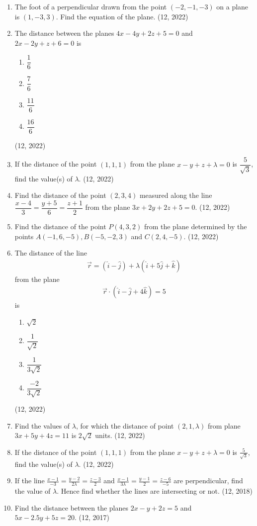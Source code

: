 \begin{enumerate}[label=\thesubsection.\arabic*, ref=\thesubsection.\theenumi]
\item The foot of a perpendicular drawn from the point $(-2,-1,-3)$ on a plane is $(1,-3,3)$. Find the equation of the plane. \hfill (12, 2022)
\item The distance between the planes $4x-4y+2z+5=0$ and $2x-2y+z+6=0$ is
	\begin{enumerate}
		\item $\dfrac{1}{6}$
		\item $\dfrac{7}{6}$
		\item $\dfrac{11}{6}$
		\item $\dfrac{16}{6}$
	\end{enumerate}
\hfill (12, 2022)
\item If the distance of the point $(1,1,1)$ from the plane $x-y+z+\lambda=0$ is $\dfrac{5}{\sqrt{3}}$, find the value(s) of $\lambda$. \hfill (12, 2022)

\item Find the distance of the point $(2,3,4)$ measured along the line $\dfrac{x-4}{3}=\dfrac{y+5}{6}=\dfrac{z+1}{2}$ from the plane $3x+2y+2z+5=0$. \hfill (12, 2022)

\item Find the distance of the point $P(4,3,2)$ from the plane determined by the points $A(-1,6,-5),B(-5,-2,3)$ and $C(2,4,-5)$. \hfill (12, 2022)

\item The distance of the line
	\begin{align}
		\vec{r}=(\hat{i}-\hat{j})+\lambda(\hat{i}+5\hat{j}+\hat{k})
	\end{align}
	from the plane
	\begin{align}
		\vec{r}\cdot(\hat{i}-\hat{j}+4\hat{k})=5
	\end{align}
	is
	\begin{enumerate}
		\item $\sqrt{2}$
		\item $\dfrac{1}{\sqrt{2}}$
		\item $\dfrac{1}{3\sqrt{2}}$
		\item $\dfrac{-2}{3\sqrt{2}}$
	\end{enumerate}
\hfill (12, 2022)

\item Find the values of $\lambda$, for which the distance of point $(2,1,\lambda)$ from plane $3x+5y+4z=11$ is $2\sqrt{2}$ units. \hfill (12, 2022)
\item If the distance of the point $(1,1,1)$ from the plane $x-y+z+\lambda=0$ is $\frac{5}{\sqrt{3}}$, find the value(s) of $\lambda$. \hfill (12, 2022)
\item If the line $\frac{x-1}{-3} = \frac{y-2}{2\lambda} = \frac{z-3}{2} $ and $\frac{x-1}{3\lambda} = \frac{y-1}{2}  = \frac{z-6}{-5} $ are perpendicular, find the value of $\lambda$. Hence find whether the lines are intersecting or not. \hfill (12, 2018)
\item Find the distance between the planes $2x - y + 2z = 5$ and $5x - 2.5y + 5z = 20$. \hfill (12, 2017)
\end{enumerate}

